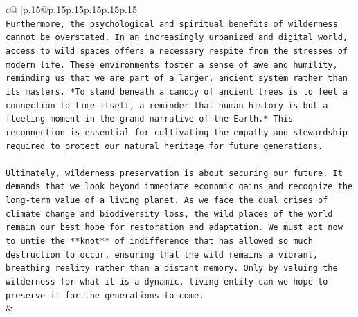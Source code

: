 \documentclass{article}
\begin{document}
{\begin{supertabular}{c@{$\;$}|p{.15\linewidth}@{}p{.15\linewidth}p{.15\linewidth}p{.15\linewidth}p{.15\linewidth}p{.15\linewidth}}
{{{\\ 
\texttt{Furthermore, the psychological and spiritual benefits of wilderness cannot be overstated. In an increasingly urbanized and digital world, access to wild spaces offers a necessary respite from the stresses of modern life. These environments foster a sense of awe and humility, reminding us that we are part of a larger, ancient system rather than its masters. *To stand beneath a canopy of ancient trees is to feel a connection to time itself, a reminder that human history is but a fleeting moment in the grand narrative of the Earth.* This reconnection is essential for cultivating the empathy and stewardship required to protect our natural heritage for future generations.} \\
\\ 
\texttt{Ultimately, wilderness preservation is about securing our future. It demands that we look beyond immediate economic gains and recognize the long{-}term value of a living planet. As we face the dual crises of climate change and biodiversity loss, the wild places of the world remain our best hope for restoration and adaptation. We must act now to untie the **knot** of indifference that has allowed so much destruction to occur, ensuring that the wild remains a vibrant, breathing reality rather than a distant memory. Only by valuing the wilderness for what it is—a dynamic, living entity—can we hope to preserve it for the generations to come.} \\
            }
        }
    }
    & \\ \\


\end{supertabular}}
\end{document}
